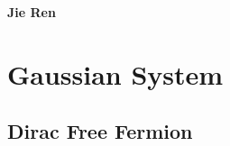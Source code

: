 \documentclass{SciPost}
\begin{document}
\pagestyle{SPstyle}

\begin{center}{\Large \textbf{\color{scipostdeepblue}{
Gaussian Lindbladian\\
}}}\end{center}

\begin{center}
\textbf{Jie Ren}
\end{center}

\tableofcontents

\section{Gaussian System}

\subsection{Dirac Free Fermion}
\end{document}
